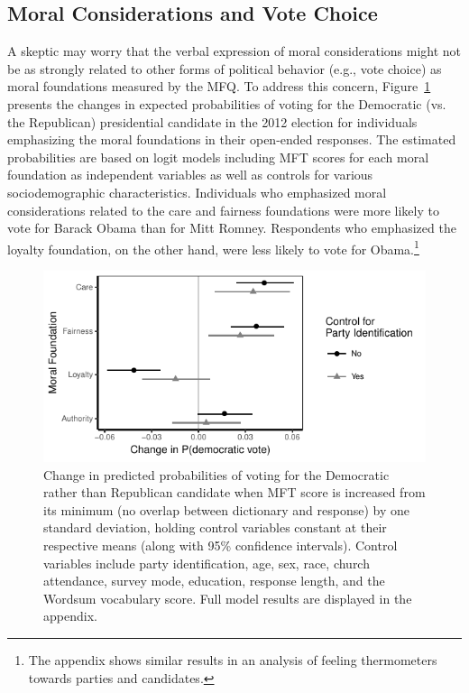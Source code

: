\documentclass[12pt]{article}
\begin{document}
\subsection*{Moral Considerations and Vote Choice}

A skeptic may worry that the verbal expression of moral considerations might not be as strongly related to other forms of political behavior (e.g., vote choice) as moral foundations measured by the MFQ. To address this concern, Figure~\ref{fig:logit_vote} presents the changes in expected probabilities of voting for the Democratic (vs. the Republican) presidential candidate in the 2012 election for individuals emphasizing the moral foundations in their open-ended responses. The estimated probabilities are based on logit models including MFT scores for each moral foundation as independent variables as well as controls for various sociodemographic characteristics. Individuals who emphasized moral considerations related to the care and fairness foundations were more likely to vote for Barack Obama than for Mitt Romney. Respondents who emphasized the loyalty foundation, on the other hand, were less likely to vote for Obama.\footnote{The appendix shows similar results in an analysis of feeling thermometers towards parties and candidates.}

\begin{figure}[ht]\centering
\includegraphics[scale=.9]{../calc/fig/logit_vote.pdf}
\caption{Change in predicted probabilities of voting for the Democratic rather than Republican candidate when MFT score is increased from its minimum (no overlap between dictionary and response) by one standard deviation, holding control variables constant at their respective means (along with 95\% confidence intervals). Control variables include party identification, age, sex, race, church attendance, survey mode, education, response length, and the Wordsum vocabulary score. Full model results are displayed in the appendix.
}\label{fig:logit_vote}
\end{figure}
\end{document}
